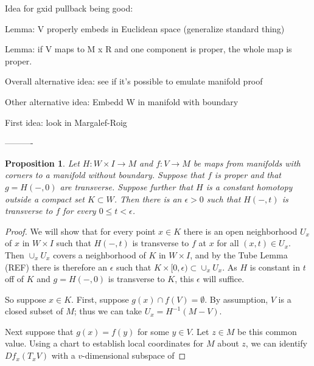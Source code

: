\documentclass[12pt]{article}
\theoremstyle{plain}
\newtheorem{proposition}[theorem]{Proposition}
\theoremstyle{definition}
\theoremstyle{remark}
\begin{document}
Idea for gxid pullback being good:

Lemma: V properly embeds in Euclidean space (generalize standard thing)

Lemma: if V maps to M x R and one component is proper, the whole map is proper.


Overall alternative idea: see if it's possible to emulate manifold proof

Other alternative idea: Embedd W in manifold with boundary

First idea: look in Margalef-Roig





----------

\begin{proposition}
Let $H \colon W \times I \to M$ and $f \colon V \to M$ be maps from manifolds with corners to a manifold without boundary. Suppose that $f$ is proper and that $g = H(-,0)$ are transverse. Suppose further that $H$ is a constant homotopy outside a compact set $K \subset W$. Then there is an $\epsilon>0$ such that $H(-,t)$ is transverse to $f$ for every $0\leq t <\epsilon$. 
\end{proposition}

\begin{proof}
We will show that for every point $x \in K$ there is an open neighborhood $U_x$ of $x$ in $W \times I$ such that $H(-,t)$ is transverse to $f$ at $x$ for all $(x,t) \in U_x$. 
Then $\cup_x U_x$ covers a neighborhood of $K$ in $W \times I$, and by the Tube Lemma (REF) there is therefore an $\epsilon$ such that $K \times [0,\epsilon) \subset \cup_x U_x$. 
As $H$ is constant in $t$ off of $K$ and $g = H(-,0)$ is transverse to $K$, this $\epsilon$ will suffice. 

So suppose $x \in K$. 
First, suppose $g(x) \cap f(V) = \emptyset$. 
By assumption, $V$ is a closed subset of $M$; thus we can take $U_x=H^{-1}(M-V)$.



Next suppose that $g(x) = f(y)$ for some $y \in V$. 
Let $z\in M$ be this common value. Using a chart to establish local coordinates for $M$ about $z$, we can identify $Df_x(T_xV)$ with a $v$-dimensional subspace of  
\end{proof}
\end{document}
